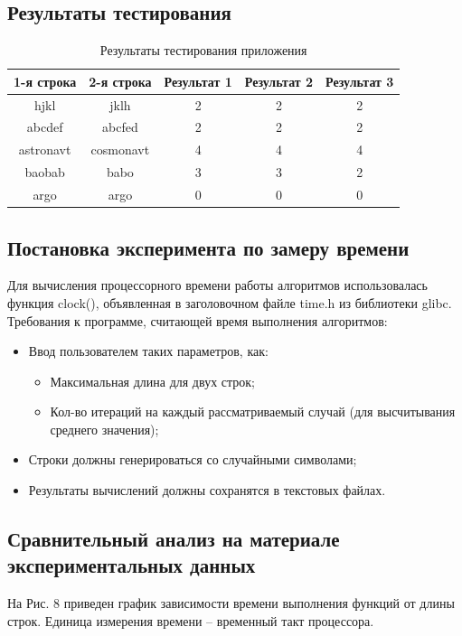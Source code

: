 \documentclass[a4paper,12pt]{article}
\begin{document}
\subsection{Результаты тестирования}
\begin{table}[h]
\caption{\label{tablice:tests}Результаты тестирования приложения}
\begin{center}
\begin{tabular}{|c|c|c|c|c|}
\hline
1-я строка & 2-я строка & Результат 1 & Результат 2 & Результат 3 \\ 
\hline
hjkl & jklh & 2 & 2 & 2 \\ 
\hline
abcdef & abcfed & 2 & 2 & 2 \\ 
\hline
astronavt & cosmonavt & 4 & 4 & 4 \\ 
\hline
baobab & babo & 3 & 3 & 2 \\ 
\hline
argo & argo & 0 & 0 & 0 \\ 
\hline
\end{tabular}
\end{center} 
\end{table}

\newpage
\subsection{Постановка эксперимента по замеру времени}
\begin{flushleft}
Для вычисления процессорного времени работы алгоритмов использовалась функция clock(), объявленная в заголовочном файле time.h из библиотеки glibc. \\
Требования к программе, считающей время выполнения алгоритмов:
\begin{itemize}
\item Ввод пользователем таких параметров, как:
\begin{itemize}
\item Максимальная длина для двух строк;
\item Кол-во итераций на каждый рассматриваемый случай (для высчитывания среднего значения);
\end{itemize}
\item Строки должны генерироваться со случайными символами;
\item Результаты вычислений должны сохранятся в текстовых файлах.
\end{itemize}
\end{flushleft}

\newpage
\subsection{Сравнительный анализ на материале экспериментальных данных}
На Рис. 8 приведен график зависимости времени выполнения функций от длины строк. Единица измерения времени – временный такт процессора. \\
\end{document}

